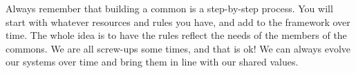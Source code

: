 \vspace{0.2cm}
Always remember that building a common is a step-by-step process. You will start with whatever resources and rules you have, and add to the framework over time. The whole idea is to have the rules reflect the needs of the members of the commons. We are all screw-ups some times, and that is ok! We can always evolve our systems over time and bring them in line with our shared values. 



